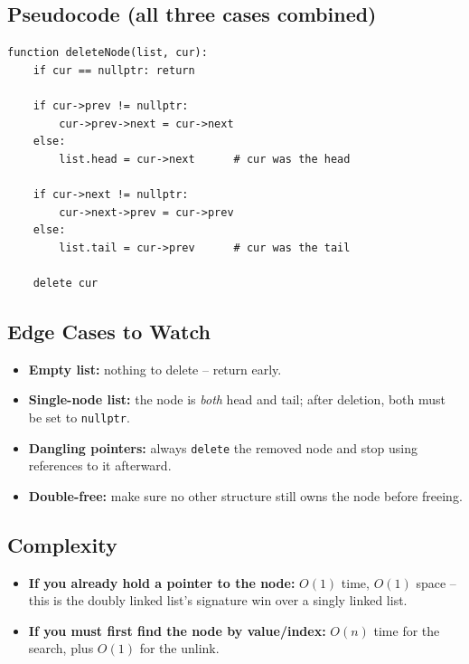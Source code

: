 \documentclass[11pt]{article}
\begin{document}
\subsection{Pseudocode (all three cases combined)}
\begin{lstlisting}[basicstyle=\ttfamily\small,frame=single]
function deleteNode(list, cur):
    if cur == nullptr: return

    if cur->prev != nullptr:
        cur->prev->next = cur->next
    else:
        list.head = cur->next      # cur was the head

    if cur->next != nullptr:
        cur->next->prev = cur->prev
    else:
        list.tail = cur->prev      # cur was the tail

    delete cur
\end{lstlisting}

\subsection{Edge Cases to Watch}
\begin{itemize}[leftmargin=*]
    \item \textbf{Empty list:} nothing to delete -- return early.
    \item \textbf{Single-node list:} the node is \emph{both} head and tail;
          after deletion, both must be set to \texttt{nullptr}.
    \item \textbf{Dangling pointers:} always \texttt{delete} the removed node
          and stop using references to it afterward.
    \item \textbf{Double-free:} make sure no other structure still owns the
          node before freeing.
\end{itemize}

\subsection{Complexity}
\begin{itemize}[leftmargin=*]
    \item \textbf{If you already hold a pointer to the node:} $O(1)$ time,
          $O(1)$ space -- this is the doubly linked list's signature win
          over a singly linked list.
    \item \textbf{If you must first find the node by value/index:} $O(n)$
          time for the search, plus $O(1)$ for the unlink.
\end{itemize}
\end{document}

